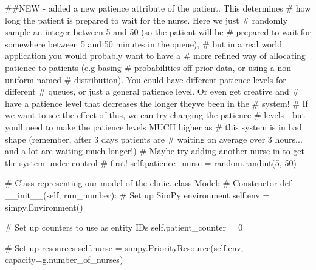 \documentclass[
  letterpaper,
  DIV=11,
  numbers=noendperiod]{scrreprt}
\newenvironment{Shaded}{\begin{snugshade}}{\end{snugshade}}
\newcommand{\CommentTok}[1]{\textcolor[rgb]{0.37,0.37,0.37}{#1}}
\newcommand{\DecValTok}[1]{\textcolor[rgb]{0.68,0.00,0.00}{#1}}
\newcommand{\FunctionTok}[1]{\textcolor[rgb]{0.28,0.35,0.67}{#1}}
\newcommand{\KeywordTok}[1]{\textcolor[rgb]{0.00,0.23,0.31}{#1}}
\newcommand{\NormalTok}[1]{\textcolor[rgb]{0.00,0.23,0.31}{#1}}
\newcommand{\OperatorTok}[1]{\textcolor[rgb]{0.37,0.37,0.37}{#1}}
\newcommand{\VariableTok}[1]{\textcolor[rgb]{0.07,0.07,0.07}{#1}}
\begin{document}
\begin{tcolorbox}
\begin{Shaded}
\begin{Highlighting}[]
        \CommentTok{\#\#NEW {-} added a new patience attribute of the patient.  This determines}
        \CommentTok{\# how long the patient is prepared to wait for the nurse.  Here we just}
        \CommentTok{\# randomly sample an integer between 5 and 50 (so the patient will be}
        \CommentTok{\# prepared to wait for somewhere between 5 and 50 minutes in the queue),}
        \CommentTok{\# but in a real world application you would probably want to have a}
        \CommentTok{\# more refined way of allocating patience to patients (e.g basing}
        \CommentTok{\# probabilities off prior data, or using a non{-}uniform named}
        \CommentTok{\# distribution).  You could have different patience levels for different}
        \CommentTok{\# queues, or just a general patience level.  Or even get creative and}
        \CommentTok{\# have a patience level that decreases the longer they\textquotesingle{}ve been in the}
        \CommentTok{\# system!}
        \CommentTok{\# If we want to see the effect of this, we can try changing the patience}
        \CommentTok{\# levels {-} but you\textquotesingle{}ll need to make the patience levels MUCH higher as}
        \CommentTok{\# this system is in bad shape (remember, after 3 days patients are}
        \CommentTok{\# waiting on average over 3 hours... and a lot are waiting much longer!)}
        \CommentTok{\# Maybe try adding another nurse in to get the system under control}
        \CommentTok{\# first!}
        \VariableTok{self}\NormalTok{.patience\_nurse }\OperatorTok{=}\NormalTok{ random.randint(}\DecValTok{5}\NormalTok{, }\DecValTok{50}\NormalTok{)}

\CommentTok{\# Class representing our model of the clinic.}
\KeywordTok{class}\NormalTok{ Model:}
    \CommentTok{\# Constructor}
    \KeywordTok{def} \FunctionTok{\_\_init\_\_}\NormalTok{(}\VariableTok{self}\NormalTok{, run\_number):}
        \CommentTok{\# Set up SimPy environment}
        \VariableTok{self}\NormalTok{.env }\OperatorTok{=}\NormalTok{ simpy.Environment()}

        \CommentTok{\# Set up counters to use as entity IDs}
        \VariableTok{self}\NormalTok{.patient\_counter }\OperatorTok{=} \DecValTok{0}

        \CommentTok{\# Set up resources}
        \VariableTok{self}\NormalTok{.nurse }\OperatorTok{=}\NormalTok{ simpy.PriorityResource(}\VariableTok{self}\NormalTok{.env,}
\NormalTok{                                            capacity}\OperatorTok{=}\NormalTok{g.number\_of\_nurses)}


\end{Highlighting}
\end{Shaded}
\end{tcolorbox}
\end{document}
